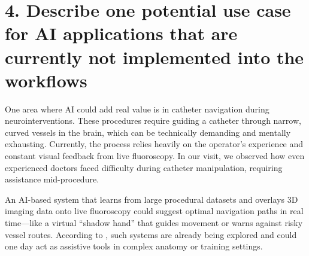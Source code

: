 \documentclass[a4paper, chapterprefix=true, numbers=noenddot]{scrreprt}
\begin{document}
\section*{4. Describe one potential use case for AI applications that are currently not implemented into the workflows}
One area where AI could add real value is in catheter navigation during neurointerventions. These procedures require guiding a catheter through narrow, curved vessels in the brain, which can be technically demanding and mentally exhausting. Currently, the process relies heavily on the operator’s experience and constant visual feedback from live fluoroscopy. In our visit, we observed how even experienced doctors faced difficulty during catheter manipulation, requiring assistance mid-procedure.\par
\vspace{\baselineskip}
\noindent
An AI-based system that learns from large procedural datasets and overlays 3D imaging data onto live fluoroscopy could suggest optimal navigation paths in real time—like a virtual “shadow hand” that guides movement or warns against risky vessel routes. According to \cite{InRa}, such systems are already being explored and could one day act as assistive tools in complex anatomy or training settings. \par

\printbibliography
\end{document}
